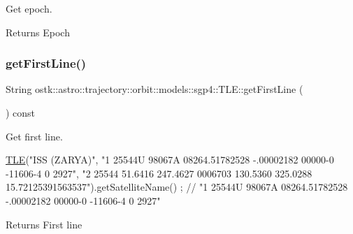 Get epoch. 

\begin{DoxyReturn}{Returns}
Epoch 
\end{DoxyReturn}
\mbox{\label{classostk_1_1astro_1_1trajectory_1_1orbit_1_1models_1_1sgp4_1_1_t_l_e_ace656b8df665ed4ba7accb0adb6fd629}} 
\subsubsection{\texorpdfstring{get\+First\+Line()}{getFirstLine()}}
{\footnotesize\ttfamily String ostk\+::astro\+::trajectory\+::orbit\+::models\+::sgp4\+::\+T\+L\+E\+::get\+First\+Line (\begin{DoxyParamCaption}{ }\end{DoxyParamCaption}) const}



Get first line. 


\begin{DoxyCode}
\hyperlink{classostk_1_1astro_1_1trajectory_1_1orbit_1_1models_1_1sgp4_1_1_t_l_e_a57323db2c24577c2e8ddce79fa776d1e}{TLE}(\textcolor{stringliteral}{"ISS (ZARYA)"},
    \textcolor{stringliteral}{"1 25544U 98067A   08264.51782528 -.00002182  00000-0 -11606-4 0  2927"},
    \textcolor{stringliteral}{"2 25544  51.6416 247.4627 0006703 130.5360 325.0288 15.72125391563537"}).getSatelliteName() ; \textcolor{comment}{// "1
       25544U 98067A   08264.51782528 -.00002182  00000-0 -11606-4 0  2927"}
\end{DoxyCode}


\begin{DoxyReturn}{Returns}
First line 
\end{DoxyReturn}
\mbox{\label{classostk_1_1astro_1_1trajectory_1_1orbit_1_1models_1_1sgp4_1_1_t_l_e_a9794bb184799595fefc8828c2849538c}} 
